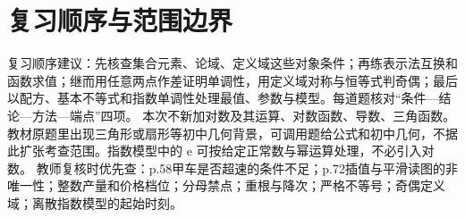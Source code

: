 \par\medskip\noindent\begin{minipage}{\linewidth}\section{复习顺序与范围边界}
复习顺序建议：先核查集合元素、论域、定义域这些对象条件；再练表示法互换和函数求值；继而用任意两点作差证明单调性，用定义域对称与恒等式判奇偶；最后以配方、基本不等式和指数单调性处理最值、参数与模型。每道题核对“条件—结论—方法—端点”四项。
本次不新加对数及其运算、对数函数、导数、三角函数。教材原题里出现三角形或扇形等初中几何背景，可调用题给公式和初中几何，不据此扩张考查范围。指数模型中的 $\mathrm e$ 可按给定正常数与幂运算处理，不必引入对数。
教师复核时优先查：p.58甲车是否超速的条件不足；p.72插值与平滑读图的非唯一性；整数产量和价格档位；分母禁点；重根与降次；严格不等号；奇偶定义域；离散指数模型的起始时刻。
\end{minipage}

